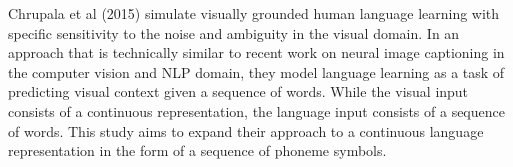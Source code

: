 Chrupala et al (2015) %
simulate visually grounded human language learning with specific sensitivity to the noise and ambiguity in the visual domain. In an approach that is technically similar to recent work on neural image captioning in the computer vision and NLP domain, they model language learning as a task of predicting visual context given a sequence of words. While the visual input consists of a continuous representation, the language input consists of a sequence of words. This study aims to expand their approach to a continuous language representation in the form of a sequence of phoneme symbols.

